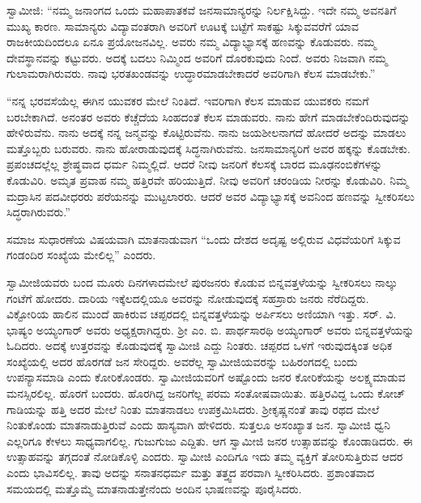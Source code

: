  ಸ್ವಾಮೀಜಿ: “ನಮ್ಮ ಜನಾಂಗದ ಒಂದು ಮಹಾಪಾತಕವೆ ಜನಸಾಮಾನ್ಯರನ್ನು ನಿರ್ಲಕ್ಷಿಸಿದ್ದು. ಇದೇ ನಮ್ಮ ಅವನತಿಗೆ ಮುಖ್ಯ ಕಾರಣ. ಸಾಮಾನ್ಯರು ವಿದ್ಯಾವಂತರಾಗಿ ಅವರಿಗೆ ಊಟಕ್ಕೆ ಬಟ್ಟೆಗೆ ಸಾಕಷ್ಟು ಸಿಕ್ಕುವವರೆಗೆ ಯಾವ ರಾಜಕೀಯದಿಂದಲೂ ಏನೂ ಪ್ರಯೋಜನವಿಲ್ಲ. ಅವರು ನಮ್ಮ ವಿದ್ಯಾಭ್ಯಾಸಕ್ಕೆ ಹಣವನ್ನು ಕೊಡುವರು. ನಮ್ಮ ದೇವಸ್ಥಾನವನ್ನು ಕಟ್ಟುವರು. ಅದಕ್ಕೆ ಬದಲು ನಿಮ್ಮಿಂದ ಅವರಿಗೆ ದೊರಕುವುದು ನಿಂದೆ. ಅವರು ನಿಜವಾಗಿ ನಮ್ಮ ಗುಲಾಮರಾಗಿರುವರು. ನಾವು ಭರತಖಂಡವನ್ನು ಉದ್ಧಾರಮಾಡಬೇಕಾದರೆ ಅವರಿಗಾಗಿ ಕೆಲಸ ಮಾಡಬೇಕು.” 

 “ನನ್ನ ಭರವಸೆಯೆಲ್ಲ ಈಗಿನ ಯುವಕರ ಮೇಲೆ ನಿಂತಿದೆ. ಇವರಿಗಾಗಿ ಕೆಲಸ ಮಾಡುವ ಯುವಕರು ನಮಗೆ ಬರಬೇಕಾಗಿದೆ. ಅನಂತರ ಅವರು ಕೆಚ್ಚೆದೆಯ ಸಿಂಹದಂತೆ ಕೆಲಸ ಮಾಡುವರು. ನಾನು ಹೇಗೆ ಮಾಡಬೇಕೆಂದಿರುವುದನ್ನು ಹೇಳಿರುವೆನು. ನಾನು ಅದಕ್ಕೆ ನನ್ನ ಜನ್ಮವನ್ನು ಕೊಟ್ಟಿರುವೆನು. ನಾನು ಜಯಶೀಲನಾಗದೆ ಹೋದರೆ ಅದನ್ನು ಮಾಡಲು ಮತ್ತೊಬ್ಬರು ಬರುವರು. ನಾನು ಹೋರಾಡುವುದಕ್ಕೆ ಸಿದ್ಧನಾಗಿರುವೆನು. ಜನಸಾಮಾನ್ಯರಿಗೆ ಅವರ ಹಕ್ಕನ್ನು ಕೊಡಬೇಕು. ಪ್ರಪಂಚದಲ್ಲೆಲ್ಲ ಶ್ರೇಷ್ಥವಾದ ಧರ್ಮ ನಿಮ್ಮಲ್ಲಿದೆ. ಆದರೆ ನೀವು ಜನರಿಗೆ ಕೆಲಸಕ್ಕೆ ಬಾರದ ಮೂಢನಂಬಿಕೆಗಳನ್ನು ಕೊಡುವಿರಿ. ಅಮೃತ ಪ್ರವಾಹ ನಮ್ಮ ಹತ್ತಿರವೇ ಹರಿಯುತ್ತಿದೆ. ನೀವು ಅವರಿಗೆ ಚರಂಡಿಯ ನೀರನ್ನು ಕೊಡುವಿರಿ. ನಿಮ್ಮ ಮದ್ರಾಸಿನ ಪದವೀಧರರು ಪರೆಯನನ್ನು ಮುಟ್ಟಲಾರರು. ಆದರೆ ಅವರ ವಿದ್ಯಾಭ್ಯಾಸಕ್ಕೆ ಅವನಿಂದ ಹಣವನ್ನು ಸ್ವೀಕರಿಸಲು ಸಿದ್ಧರಾಗಿರುವರು.” 

 ಸಮಾಜ ಸುಧಾರಣೆಯ ವಿಷಯವಾಗಿ ಮಾತನಾಡುವಾಗ “ಒಂದು ದೇಶದ ಅದೃಷ್ಟ ಅಲ್ಲಿರುವ ವಿಧವೆಯರಿಗೆ ಸಿಕ್ಕುವ ಗಂಡಂದಿರ ಸಂಖ್ಯೆಯ ಮೇಲಿಲ್ಲ” ಎಂದರು. 

 ಸ್ವಾಮೀಜಿಯವರು ಬಂದ ಮೂರು ದಿನಗಳಾದಮೇಲೆ ಪುರಜನರು ಕೊಡುವ ಬಿನ್ನವತ್ತಳೆಯನ್ನು ಸ್ವೀಕರಿಸಲು ನಾಲ್ಕು ಗಂಟೆಗೆ ಹೋದರು. ದಾರಿಯ ಇಕ್ಕೆಲದಲ್ಲಿಯೂ ಅವರನ್ನು ನೋಡುವುದಕ್ಕೆ ಸಹಸ್ರಾರು ಜನರು ನೆರೆದಿದ್ದರು. ವಿಕ್ಟೋರಿಯ ಹಾಲಿನ ಮುಂದೆ ಹಾಕಿರುವ ಚಪ್ಪರದಲ್ಲಿ ಬಿನ್ನವತ್ತಳೆಯನ್ನು ಅರ್ಪಿಸಲು ಅಣಿಯಾಗಿ ಇತ್ತು. ಸರ್. ವಿ. ಭಾಷ್ಯಂ ಅಯ್ಯಂಗಾರ್ ಅವರು ಅಧ್ಯಕ್ಷರಾಗಿದ್ದರು. ಶ‍್ರೀ ಎಂ. ಬಿ. ಪಾರ್ಥಸಾರಥಿ ಅಯ್ಯಂಗಾರ್ ಅವರು ಬಿನ್ನವತ್ತಳೆಯನ್ನು ಓದಿದರು. ಅದಕ್ಕೆ ಉತ್ತರವನ್ನು ಕೊಡುವುದಕ್ಕೆ ಸ್ವಾಮೀಜಿ ಎದ್ದು ನಿಂತರು. ಚಪ್ಪರದ ಒಳಗೆ ಇರುವುದಕ್ಕಿಂತ ಅಧಿಕ ಸಂಖ್ಯೆಯಲ್ಲಿ ಅದರ ಹೊರಗಡೆ ಜನ ಸೇರಿದ್ದರು. ಅವರೆಲ್ಲ ಸ್ವಾಮೀಜಿಯವರನ್ನು ಬಹಿರಂಗದಲ್ಲಿ ಬಂದು ಉಪನ್ಯಾಸಮಾಡಿ ಎಂದು ಕೋರಿಕೊಂಡರು. ಸ್ವಾಮೀಜಿಯವರಿಗೆ ಅಷ್ಟೊಂದು ಜನರ ಕೋರಿಕೆಯನ್ನು ಅಲಕ್ಷ್ಯಮಾಡುವ ಮನಸ್ಸಿರಲಿಲ್ಲ. ಹೊರಗೆ ಬಂದರು. ಹೊರಗಿದ್ದ ಜನರಿಗೆಲ್ಲ ಪರಮ ಸಂತೋಷವಾಯಿತು. ಹತ್ತಿರವಿದ್ದ ಒಂದು ಕೋಚ್ ಗಾಡಿಯನ್ನು ಹತ್ತಿ ಅದರ ಮೇಲೆ ನಿಂತು ಮಾತನಾಡಲು ಉಪಕ್ರಮಿಸಿದರು. ಶ‍್ರೀಕೃಷ್ಣನಂತೆ ತಾವು ರಥದ ಮೇಲೆ ನಿಂತುಕೊಂಡು ಮಾತನಾಡುತ್ತಿರುವೆ ಎಂದು ಹಾಸ್ಯವಾಗಿ ಹೇಳಿದರು. ಸುತ್ತಲೂ ಅಸಂಖ್ಯಾತ ಜನ. ಸ್ವಾಮೀಜಿ ಧ್ವನಿ ಎಲ್ಲರಿಗೂ ಕೇಳಲು ಸಾಧ್ಯವಾಗಲಿಲ್ಲ. ಗುಜುಗುಜು ಎದ್ದಿತು. ಆಗ ಸ್ವಾಮೀಜಿ ಜನರ ಉತ್ಸಾಹವನ್ನು ಕೊಂಡಾಡಿದರು. ಈ ಉತ್ಸಾಹವನ್ನು ತಗ್ಗದಂತೆ ನೋಡಿಕೊಳ್ಳಿ ಎಂದರು. ಸ್ವಾಮೀಜಿ ಎಂದಿಗೂ ಇದು ತಮ್ಮ ವ್ಯಕ್ತಿಗೆ ತೋರಿಸುತ್ತಿರುವ ಆದರ ಎಂದು ಭಾವಿಸಲಿಲ್ಲ. ತಾವು ಅದನ್ನು ಸನಾತನಧರ್ಮ ಮತ್ತು ತತ್ತ್ವದ ಪರವಾಗಿ ಸ್ವೀಕರಿಸಿದರು. ಪ್ರಶಾಂತವಾದ ಸಮಯದಲ್ಲಿ ಮತ್ತೊಮ್ಮೆ ಮಾತನಾಡುತ್ತೇನೆಂದು ಅಂದಿನ ಭಾಷಣವನ್ನು ಪೂರೈಸಿದರು. 

